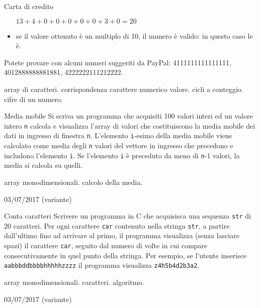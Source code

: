 \begin{exrev}{Carta di credito}
\begin{itemize}
$13 + 4 + 0 + 0 + 0 + 0 + 0 + 3 + 0 = 20$

\item se il valore ottenuto \`e un multiplo di 10, il numero \`e valido: in questo caso le \`e.
\end{itemize}

Potete provare con alcuni numeri suggeriti da PayPal: 4111111111111111, 4012888888881881, 4222222111212222.

\begin{tags}
array di caratteri. corrispondenza carattere numerico valore. cicli a conteggio. cifre di un numero.
\end{tags}
\end{exrev}

\begin{exrev}{Media mobile}
Si scriva un programma che acquisiti 100 valori interi ed un valore intero \texttt{n} calcola e visualizza l'array di valori che costituiscono la media mobile dei dati in ingresso di finestra \texttt{n}. L'elemento \texttt{i}-esimo della media mobile viene calcolato come media degli \texttt{n} valori del vettore in ingresso che precedono e includono l'elemento \texttt{i}. Se l'elemento \texttt{i} \`e preceduto da meno di \texttt{n}-1 valori, la media si calcola su quelli.


\begin{tags}
array monodimensionali. calcolo della media.
\end{tags}

\begin{esame}
03/07/2017 (variante)
\end{esame}


\end{exrev}

\begin{exrev}{Conta caratteri}
Scrivere un programma in C che acquisisca una sequenza \texttt{str} di 20 caratteri. Per ogni carattere \texttt{car} contenuto nella stringa \texttt{str}, a partire dall'ultimo fino ad arrivare al primo, il programma visualizza (senza lasciare spazi) il carattere \texttt{car}, seguito dal numero di volte in cui compare consecutivamente in quel punto della stringa. Per esempio, se l'utente inserisce \texttt{aabbbddbbbbhhhhhzzzz} il programma visualizza \texttt{z4h5b4d2b3a2}.


\begin{tags}
array monodimensionali. caratteri. algoritmo.
\end{tags}

\begin{esame}
03/07/2017 (variante)
\end{esame}





\end{exrev}


